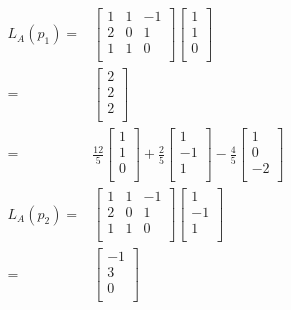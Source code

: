 \documentclass{article}
\begin{document}
~

\begin{equation*}
\begin{split}
L_A(p_1)=&\begin{bmatrix}
1&1&-1\\
2&0&1\\
1&1&0\\
\end{bmatrix}\begin{bmatrix}
1\\
1\\
0\\
\end{bmatrix}\\
=&\begin{bmatrix}
2\\
2\\
2\\
\end{bmatrix}\\
=&\frac{12}{5}\begin{bmatrix}
1\\
1\\
0\\
\end{bmatrix}+\frac{2}{5}\begin{bmatrix}
1\\
-1\\
1\\
\end{bmatrix}-\frac{4}{5}\begin{bmatrix}
1\\
0\\
-2\\
\end{bmatrix}\\
L_A(p_2)=&\begin{bmatrix}
1&1&-1\\
2&0&1\\
1&1&0\\
\end{bmatrix}\begin{bmatrix}
1\\
-1\\
1\\
\end{bmatrix}\\
=&\begin{bmatrix}
-1\\
3\\
0\\
\end{bmatrix}\\

\end{split}
\end{equation*}
\end{document}
